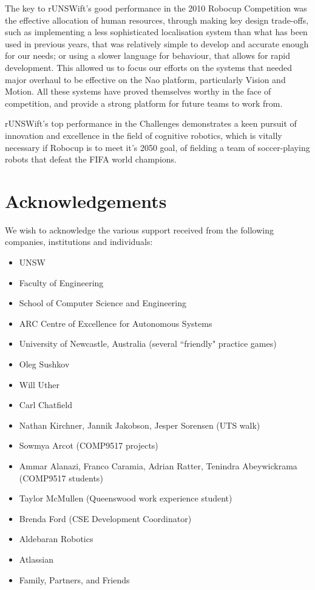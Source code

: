 \documentclass[pdftex,11pt,a4paper]{report}
\begin{document}
The key to rUNSWift's good performance in the 2010 Robocup Competition was the effective allocation of human resources, through making key design trade-offs, such as implementing a less sophisticated localisation system than what has been used in previous years, that was relatively simple to develop and accurate enough for our needs; or using a slower language for behaviour, that allows for rapid development. This allowed us to focus our efforts on the systems that needed major overhaul to be effective on the Nao platform, particularly Vision and Motion. All these systems have proved themselves worthy in the face of competition, and provide a strong platform for future teams to work from.

rUNSWift's top performance in the Challenges demonstrates a keen pursuit of innovation and excellence in the field of cognitive robotics, which is vitally necessary if Robocup is to meet it's 2050 goal, of fielding a team of soccer-playing robots that defeat the FIFA world champions.

\newpage 

\chapter{Acknowledgements}
We wish to acknowledge the various support received from the following companies, institutions and individuals:
\begin{itemize}
\item UNSW
\item Faculty of Engineering
\item School of Computer Science and Engineering
\item ARC Centre of Excellence for Autonomous Systems
\item University of Newcastle, Australia (several ``friendly" practice games)
\item Oleg Sushkov
\item Will Uther
\item Carl Chatfield
\item Nathan Kirchner, Jannik Jakobson, Jesper Sorensen (UTS walk)
\item Sowmya Arcot (COMP9517 projects) 
\item Ammar Alanazi, Franco Caramia, Adrian Ratter, Tenindra Abeywickrama \\(COMP9517 students)
\item Taylor McMullen (Queenswood work experience student)
\item Brenda Ford (CSE Development Coordinator)
\item Aldebaran Robotics
\item Atlassian
\item Family, Partners, and Friends
\end{itemize}
\newpage
\end{document}
